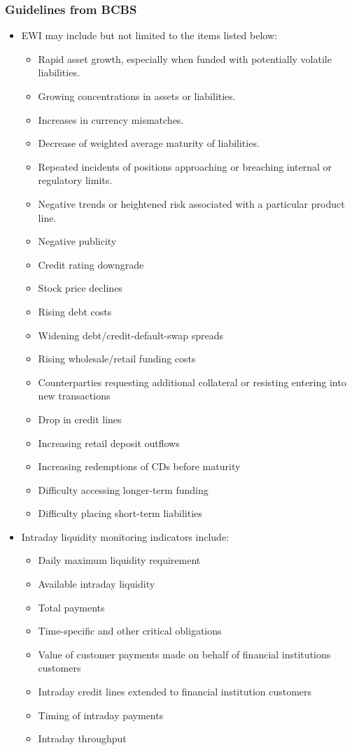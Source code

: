 \subsubsection{Guidelines from BCBS}
\begin{itemize}
\item EWI may include but not limited to the items listed below:
    \begin{itemize}
    \item Rapid asset growth, especially when funded with potentially volatile liabilities.
    \item Growing concentrations in assets or liabilities.
    \item Increases in currency mismatches.
    \item Decrease of weighted average maturity of liabilities.
    \item Repeated incidents of positions approaching or breaching internal or regulatory limits.
    \item Negative trends or heightened risk associated with a particular product line.
    \item Negative publicity
    \item Credit rating downgrade
    \item Stock price declines
    \item Rising debt costs
    \item Widening debt/credit-default-swap spreads
    \item Rising wholesale/retail funding costs
    \item Counterparties requesting additional collateral or resisting entering into new transactions
    \item Drop in credit lines
    \item Increasing retail deposit outflows
    \item Increasing redemptions of CDs before maturity
    \item Difficulty accessing longer-term funding
    \item Difficulty placing short-term liabilities
    \end{itemize}
\item Intraday liquidity monitoring indicators include:
    \begin{itemize}
    \item Daily maximum liquidity requirement
    \item Available intraday liquidity
    \item Total payments
    \item Time-specific and other critical obligations
    \item Value of customer payments made on behalf of financial institutions customers
    \item Intraday credit lines extended to financial institution customers
    \item Timing of intraday payments
    \item Intraday throughput
    \end{itemize}
\end{itemize}



